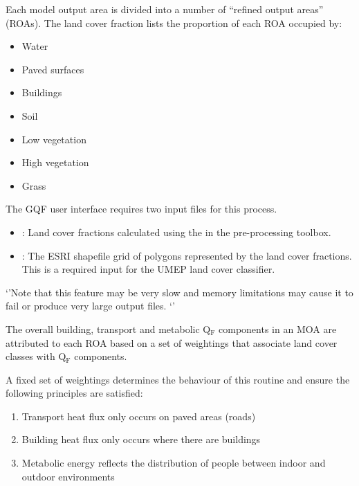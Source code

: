 \documentclass[letterpaper,10pt,english]{sphinxmanual}
\begin{document}
Each model output area is divided into a number of “refined output
areas” (ROAs). The land cover fraction lists the proportion of each ROA
occupied by:
\begin{itemize}
\item {} 
Water

\item {} 
Paved surfaces

\item {} 
Buildings

\item {} 
Soil

\item {} 
Low vegetation

\item {} 
High vegetation

\item {} 
Grass

\end{itemize}

The GQF user interface requires two input files for this process.
\begin{itemize}
\item {} 
: Land cover fractions calculated using the
{\hyperref[\detokenize{pre-processor/Urban Land Cover Land Cover Reclassifier:landcoverreclassifier}]{}} in the pre-processing toolbox.

\item {} 
: The ESRI shapefile grid of polygons
represented by the land cover fractions. This is a required input for
the UMEP land cover classifier.

\end{itemize}

‘’Note that this feature may be very slow and memory limitations may
cause it to fail or produce very large output files. ‘’

The overall building, transport and metabolic Q$_{\text{F}}$ components in
an MOA are attributed to each ROA based on a set of weightings that
associate land cover classes with Q$_{\text{F}}$ components.

A fixed set of weightings determines the behaviour of this routine and
ensure the following principles are satisfied:
\begin{enumerate}
\item {} 
Transport heat flux only occurs on paved areas (roads)

\item {} 
Building heat flux only occurs where there are buildings

\item {} 
Metabolic energy reflects the distribution of people between indoor
and outdoor environments

\end{enumerate}
\end{document}
